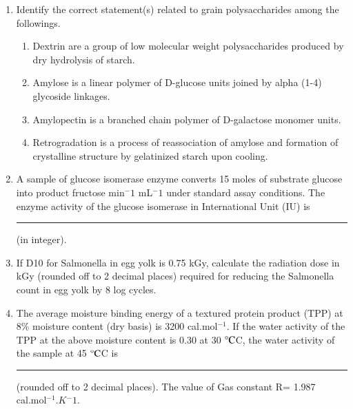 \documentclass[journal,12pt,onecolumn]{IEEEtran}
\begin{document}
\begin{enumerate}
    \item Identify the correct statement(s) related to grain polysaccharides among the followings.
    \begin{enumerate}
        \item Dextrin are a group of low molecular weight polysaccharides produced by dry hydrolysis of starch.
        \item Amylose is a linear polymer of D-glucose units joined by alpha (1-4) glycoside linkages.
        \item Amylopectin is a branched chain polymer of D-galactose monomer units.
        \item Retrogradation is a process of reassociation of amylose and formation of crystalline structure by gelatinized starch upon cooling.
    \end{enumerate}

    \item A sample of glucose isomerase enzyme converts 15 moles of substrate glucose into product fructose min$^-1$ mL$^-1$ under standard assay conditions. The enzyme activity of the glucose isomerase in International Unit (IU) is \rule{1 cm}{0.15 mm} (in integer).

    \item If D10 for Salmonella in egg yolk is 0.75 kGy, calculate the radiation dose in kGy (rounded off to 2 decimal places) required for reducing the Salmonella count in egg yolk by 8 log cycles.

    \item The average moisture binding energy of a textured protein product (TPP) at 8\% moisture content (dry basis) is 3200 cal.mol$^{-1}$. If the water activity of the TPP at the above moisture content is 0.30 at 30 $\celsius$C, the water activity of the sample at 45 $\celsius$C is \rule{1 cm}{0.15 mm} (rounded off to 2 decimal places). The value of Gas constant R= 1.987 cal.mol$^{-1}$.$K{^-1}$.
\end{enumerate}
\end{document}
